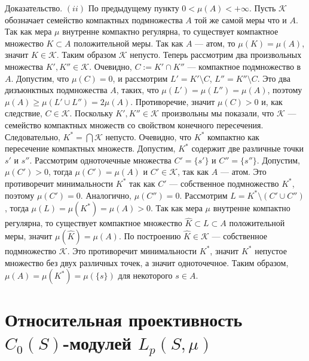 \documentclass[12pt]{article}
\numberwithin{equation}{subsection}
\theoremstyle{plain}
\newenvironment{proof}{Доказательство.}{}
\begin{document}
\begin{fulltext}
\begin{proof}
        $(ii)$ По предыдущему пункту $0<\mu(A)<+\infty$. Пусть $\mathcal{K}$
        обозначает семейство компактных подмножества $A$ той же самой меры что и
        $A$. Так как мера $\mu$ внутренне компактно регулярна, то существует
        компактное множество $K\subset A$ положительной меры. Так как $A$ ---
        атом, то $\mu(K)=\mu(A)$, значит $K\in\mathcal{K}$. Таким образом
        $\mathcal{K}$ непусто. Теперь рассмотрим два произвольных множества
        $K',K''\in\mathcal{K}$. Очевидно, $C:=K'\cap K''$ --- компактное
        подмножество в $A$. Допустим, что $\mu(C)=0$, и рассмотрим
        $L'=K'\setminus C$, $L''=K''\setminus C$. Это два дизъюнктных
        подмножества $A$, таких, что $\mu(L')=\mu(L'')=\mu(A)$, поэтому
        $\mu(A)\geq \mu(L'\cup L'')=2\mu(A)$. Противоречие, значит $\mu(C)>0$ и,
        как следствие, $C\in\mathcal{K}$. Поскольку $K', K''\in \mathcal{K}$
        произвольны мы показали, что $\mathcal{K}$ --- семейство компактных
        множеств со свойством конечного пересечения. Следовательно,
        $K^*=\bigcap\mathcal{K}$ непусто. Очевидно, что $K^*$ компактно как
        пересечение компактных множеств. Допустим, $K^*$ содержит две различные
        точки $s'$ и $s''$. Рассмотрим одноточечные множества $C'=\{s'\}$ и
        $C''=\{s''\}$. Допустим, $\mu(C')>0$, тогда $\mu(C')=\mu(A)$ и
        $C'\in\mathcal{K}$, так как $A$ --- атом. Это противоречит минимальности
        $K^*$ так как $C'$ --- собственное подмножество $K^*$, поэтому
        $\mu(C')=0$. Аналогично, $\mu(C'')=0$. Рассмотрим $L=K^*\setminus
        (C'\cup C'')$, тогда $\mu(L)=\mu(K^*)=\mu(A)>0$. Так как мера $\mu$
        внутренне компактно регулярна, то существует компактное множество
        $\hat{K}\subset L\subset A$ положительной меры, значит
        $\mu(\hat{K})=\mu(A)$. По построению $\hat{K}\in\mathcal{K}$ ---
        собственное подмножество $\mathcal{K}$. Это противоречит минимальности
        $K^*$, значит $K^*$ непустое множество без двух различных точек, а
        значит одноточечное. Таким образом, $\mu(A)=\mu(K^*)=\mu(\{s\})$ для
        некоторого $s\in A$.
    \end{proof}


    \section{Относительная проективность $C_0(S)$-модулей
      $L_p(S,\mu)$}\label{SectionRelativeProjectivityOfC0SModulesLpSmu}


\end{fulltext}
\end{document}
